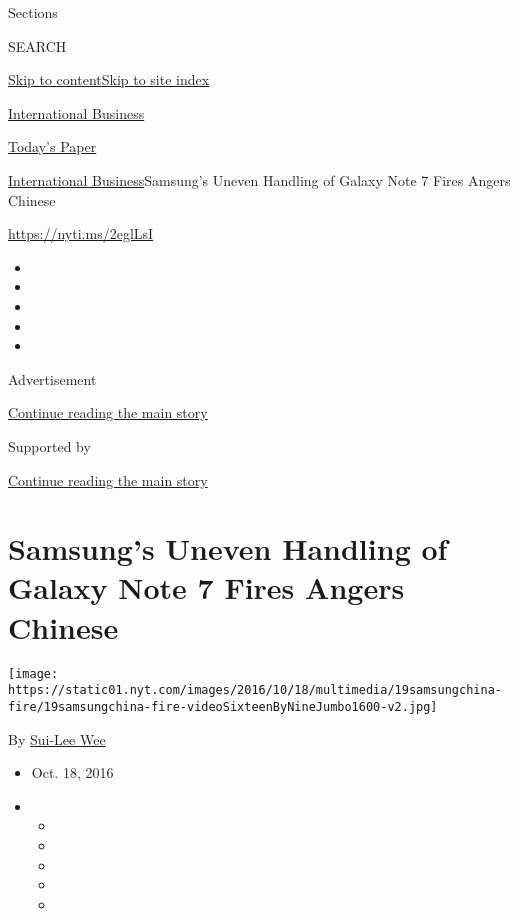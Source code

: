 Sections

SEARCH

\protect\hyperlink{site-content}{Skip to
content}\protect\hyperlink{site-index}{Skip to site index}

\href{https://www.nytimes.com/section/business}{International Business}

\href{https://myaccount.nytimes.com/auth/login?response_type=cookie\&client_id=vi}{}

\href{https://www.nytimes.com/section/todayspaper}{Today's Paper}

\href{/section/business}{International Business}\textbar{}Samsung's
Uneven Handling of Galaxy Note 7 Fires Angers Chinese

\url{https://nyti.ms/2eglLsI}

\begin{itemize}
\item
\item
\item
\item
\item
\end{itemize}

Advertisement

\protect\hyperlink{after-top}{Continue reading the main story}

Supported by

\protect\hyperlink{after-sponsor}{Continue reading the main story}

\hypertarget{samsungs-uneven-handling-of-galaxy-note-7-fires-angers-chinese}{%
\section{Samsung's Uneven Handling of Galaxy Note 7 Fires Angers
Chinese}\label{samsungs-uneven-handling-of-galaxy-note-7-fires-angers-chinese}}

\texttt{[image: https://static01.nyt.com/images/2016/10/18/multimedia/19samsungchina-fire/19samsungchina-fire-videoSixteenByNineJumbo1600-v2.jpg]}

By \href{https://www.nytimes.com/by/sui-lee-wee}{Sui-Lee Wee}

\begin{itemize}
\item
  Oct. 18, 2016
\item
  \begin{itemize}
  \item
  \item
  \item
  \item
  \item
  \end{itemize}
\end{itemize}

